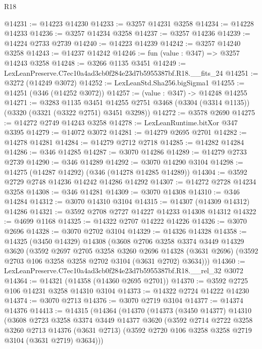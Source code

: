 \begin{lexlean}{R18}
\begin{coremodule}
@14231 := @14223 @14230
@14233 := @3257 @14231 @3258
@14234 := @14228 @14233
@14236 := @3257 @14234 @3258
@14237 := @3257 @14236
@14239 := @14224 @2733 @2739
@14240 := @14223 @14239
@14242 := @3257 @14240 @3258
@14243 := @14237 @14242
@14246 := fun (value : @347) => @3257 @14243 @3258
@14248 := @3266 @1135 @3451
@14249 := LexLeanPreserve.C7ec10a4ad3cb0f284e23d7b5955387bf.R18.__fits_24
@14251 := @3272 (@14249 @3072)
@14252 := LexLeanStd.Sha256.bigSigma1
@14255 := @14251 (@346 (@14252 @3072))
@14257 := (value : @347) -> @14248 @14255
@14271 := @3283
    @1135
    @3451
    @14255
    @2751
    @3468
    (@3304 (@3314 @1135))
    (@3320 (@3321 (@3322 @2751) @3451 @3298))
@14272 := @3578 @2690
@14275 := @14272 @2749 @14243 @3258
@14278 := LexLeanRuntime.bitXor @347 @3395
@14279 := @14072 @3072
@14281 := @14279 @2695 @2701
@14282 := @14278 @14281
@14284 := @14279 @2712 @2718
@14285 := @14282 @14284
@14286 := @346 @14285
@14287 := @3070 @14286
@14289 := @14279 @2733 @2739
@14290 := @346 @14289
@14292 := @3070 @14290 @3104
@14298 := @14275 (@14287 @14292) (@346 (@14278 @14285 @14289))
@14304 := @3592 @2729 @2748 @14236 @14242 @14286 @14292
@14307 := @14272 @2728 @14234 @3258
@14308 := @346 @14281
@14309 := @3070 @14308
@14310 := @346 @14284
@14312 := @3070 @14310 @3104
@14315 := @14307 (@14309 @14312) @14286
@14321 := @3592 @2708 @2727 @14227 @14233 @14308 @14312
@14322 := @4699 @1168
@14325 := @14322 @2707 @14222 @14226
@14326 := @3070 @2696
@14328 := @3070 @2702 @3104
@14329 := @14326 @14328
@14358 := @14325
    (@3450 @14329)
    @14308
    (@3608
      @2706
      @3258
      @3374
      @3449
      @14329
      @3620
      (@3592
        @2697
        @2705
        @3258
        @3260
        @2696
        @14328
        (@3631 @2696)
        (@3592 @2703 @106 @3258 @3258 @2702 @3104 (@3631 @2702) @3634)))
@14360 := LexLeanPreserve.C7ec10a4ad3cb0f284e23d7b5955387bf.R18.__rel_32 @3072
@14364 := @14321 (@14358 (@14360 @2695 @2701))
@14370 := @3592 @2725 @106 @14231 @3258 @14310 @3104
@14373 := @14322 @2724 @14222 @14230
@14374 := @3070 @2713
@14376 := @3070 @2719 @3104
@14377 := @14374 @14376
@14413 := @14315
    (@14364
      (@14370
        (@14373
          (@3450 @14377)
          @14310
          (@3608
            @2723
            @3258
            @3374
            @3449
            @14377
            @3620
            (@3592
              @2714
              @2722
              @3258
              @3260
              @2713
              @14376
              (@3631 @2713)
              (@3592 @2720 @106 @3258 @3258 @2719 @3104 (@3631 @2719) @3634)))

\end{coremodule}
\end{lexlean}
